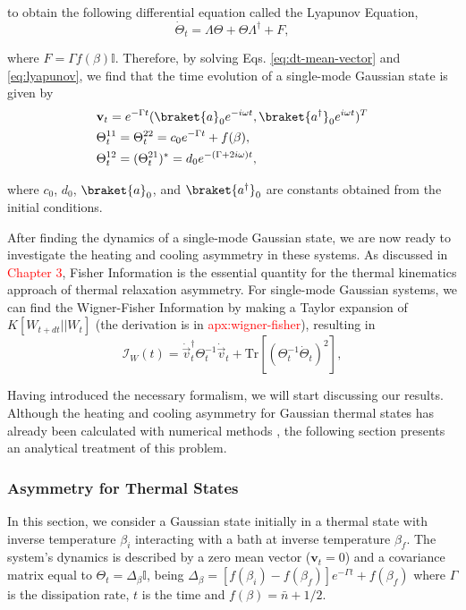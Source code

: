 \noindent to obtain the following differential equation called the Lyapunov Equation,
\begin{equation}
    \dot{\Theta}_t = \Lambda \Theta + \Theta \Lambda^\dagger + F,
    \label{eq:lyapunov}
\end{equation}

\noindent where $F = \Gamma f(\beta) \mathbb{I}$. Therefore, by solving Eqs. \eqref{eq:dt-mean-vector} and \eqref{eq:lyapunov}, we find that the time evolution of a single-mode Gaussian state is given by
\begin{align}
    &\mathbf{v}_t = e^{-\Gamma t} (\braket{a}_0 e^{-i \omega t}, \braket{a^\dagger}_0 e^{i \omega t})^T\\
    &\Theta_t^{11} = \Theta_t^{22} = c_{0} e^{-\Gamma t} + f(\beta),\\
    &\Theta_t^{12} = (\Theta_t^{21})^* = d_{0} e^{-(\Gamma + 2i\omega)t},
\end{align}

\noindent where $c_0$, $d_0$, $\braket{a}_0$, and $\braket{a^\dagger}_0$ are constants obtained from the initial conditions.

After finding the dynamics of a single-mode Gaussian state, we are now ready to investigate the heating and cooling asymmetry in these systems. As discussed in \textcolor{red}{Chapter 3}, Fisher Information is the essential quantity for the thermal kinematics approach of thermal relaxation asymmetry. For single-mode Gaussian systems, we can find the Wigner-Fisher Information by making a Taylor expansion of $K[W_{t+dt} || W_t]$ (the derivation is in \textcolor{red}{apx:wigner-fisher}), resulting in
\begin{equation}
    \mathcal{I}_W (t) = \dot{\vec{v}}_t^\dagger \Theta^{-1}_t \dot{\vec{v}}_t + \text{Tr}[(\Theta_t^{-1} \dot{\Theta}_t)^2],
    \label{eq:wigner-fisher}
\end{equation}

Having introduced the necessary formalism, we will start discussing our results. Although the heating and cooling asymmetry for Gaussian thermal states has already been calculated with numerical methods \cite{tejero-2025}, the following section presents an analytical treatment of this problem.

\subsubsection{Asymmetry for Thermal States}\label{sec:result-thermal}

In this section, we consider a Gaussian state initially in a thermal state with inverse temperature $\beta_i$ interacting with a bath at inverse temperature $\beta_f$. The system's dynamics is described by a zero mean vector ($\mathbf{v}_t = 0$) and a covariance matrix equal to $\Theta_t = \Delta_\beta \mathbb{I}$, being $\Delta_{\beta} = [f(\beta_i) - f(\beta_f)]e^{-\Gamma t} + f(\beta_f)$ where $\Gamma$ is the dissipation rate, $t$ is the time and $f(\beta) = \bar{n} + 1/2$.

